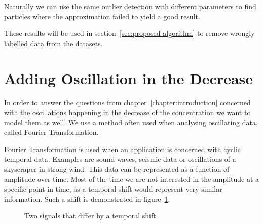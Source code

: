 Naturally we can use the same outlier detection with different parameters to find particles where the approximation failed to yield a good result.

These results will be used in section~\ref{sec:proposed-algorithm} to remove wrongly-labelled data from the datasets.

\section{Adding Oscillation in the Decrease}

In order to answer the questions from chapter~\ref{chapter:introduction} concerned with the oscillations  happening in the decrease of the \Calcium concentration we want to model them as well. We use a method often used when analysing oscillating data, called Fourier Transformation.

Fourier Transformation is used when an application is concerned with cyclic temporal data. Examples are sound waves, seismic data or oscillations of a skyscraper in strong wind. This data can be represented as a function of amplitude over time. Most of the time we are not interested in the amplitude at a specific point in time, as a temporal shift would represent very similar information. Such a shift is demonstrated in figure~\ref{fig:tempoal_shift}.

\begin{figure}[h]
	\centering
	
	\begin{subfigure}[b]{\textwidth}
	\end{subfigure}
	
	\caption{Two signals that differ by a temporal shift.}
	\label{fig:tempoal_shift}
\end{figure}

